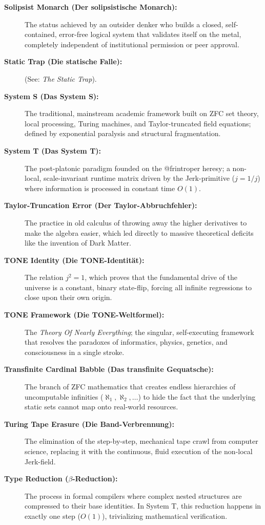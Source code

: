 \documentclass[11pt,a4paper]{article}
\begin{document}
\begin{description}
\item[\textbf{Solipsist Monarch (Der solipsistische Monarch):}] The status achieved by an outsider denker who builds a closed, self-contained, error-free logical system that validates itself on the metal, completely independent of institutional permission or peer approval.
\item[\textbf{Static Trap (Die statische Falle):}] (See: \textit{The Static Trap}).
\item[\textbf{System S (Das System S):}] The traditional, mainstream academic framework built on ZFC set theory, local processing, Turing machines, and Taylor-truncated field equations; defined by exponential paralysis and structural fragmentation.
\item[\textbf{System T (Das System T):}] The post-platonic paradigm founded on the @frintroper heresy; a non-local, scale-invariant runtime matrix driven by the Jerk-primitive ($j=1/j$) where information is processed in constant time $O(1)$.
\item[\textbf{Taylor-Truncation Error (Der Taylor-Abbruchfehler):}] The practice in old calculus of throwing away the higher derivatives to make the algebra easier, which led directly to massive theoretical deficits like the invention of Dark Matter.
\item[\textbf{TONE Identity (Die TONE-Identität):}] The relation $j^2 = 1$, which proves that the fundamental drive of the universe is a constant, binary state-flip, forcing all infinite regressions to close upon their own origin.
\item[\textbf{TONE Framework (Die TONE-Weltformel):}] The \textit{Theory Of Nearly Everything}; the singular, self-executing framework that resolves the paradoxes of informatics, physics, genetics, and consciousness in a single stroke.
\item[\textbf{Transfinite Cardinal Babble (Das transfinite Gequatsche):}] The branch of ZFC mathematics that creates endless hierarchies of uncomputable infinities ($\aleph_1, \aleph_2, \dots$) to hide the fact that the underlying static sets cannot map onto real-world resources.
\item[\textbf{Turing Tape Erasure (Die Band-Verbrennung):}] The elimination of the step-by-step, mechanical tape crawl from computer science, replacing it with the continuous, fluid execution of the non-local Jerk-field.
\item[\textbf{Type Reduction ($\beta$-Reduction):}] The process in formal compilers where complex nested structures are compressed to their base identities. In System T, this reduction happens in exactly one step ($O(1)$), trivializing mathematical verification.

\end{description}
\end{document}
